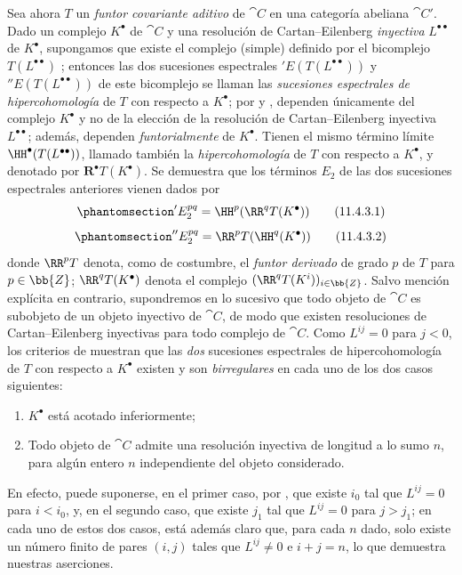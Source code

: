 \documentclass[oneside]{amsart}
\newcommand{\oldpage}[2][]{{\marginnote{\normalfont\textbf{#1}~|~#2}}\ignorespaces}
\let\EGAOriginalLabel\label
\renewcommand{\label}[1]{\phantomsection\EGAOriginalLabel{#1}}
\begin{document}
\begin{env}[11.4.3]
\label{0.11.4.3}
Sea ahora $T$ un \emph{funtor covariante aditivo} de $\cat{C}$ en una categoría abeliana $\cat{C'}$.
Dado un complejo $K^\bullet$ de $\cat{C}$ y una resolución de Cartan--Eilenberg \emph{inyectiva} $L^{\bullet\bullet}$ de $K^{\bullet}$, supongamos que existe el complejo (simple) definido por el bicomplejo $T(L^{\bullet\bullet})$ ;
entonces las dos sucesiones espectrales $'E(T(L^{\bullet\bullet}))$ y $''E(T(L^{\bullet\bullet}))$ de este bicomplejo se llaman las \emph{sucesiones espectrales de hipercohomología} de $T$ con respecto a $K^\bullet$;
por  y , dependen únicamente del complejo $K^\bullet$ y no de la elección de la resolución de Cartan--Eilenberg inyectiva $L^{\bullet\bullet}$;
además, dependen \emph{funtorialmente} de $K^\bullet$.
Tienen el mismo término límite $\HH^\bullet(T(L^{\bullet\bullet}))$, llamado también la \emph{hipercohomología} de $T$ con respecto a $K^\bullet$, y denotado por $\mathbf{R}^\bullet T(K^\bullet)$.
Se demuestra que los términos $E_2$ de las dos sucesiones espectrales anteriores vienen dados por
\[
\label{0.11.4.3.1}
  'E_2^{pq}
  = \HH^p(\RR^q T(K^\bullet))
\tag{11.4.3.1}
\]
\[
\label{0.11.4.3.2}
  ''E_2^{pq}
  = \RR^p T(\HH^q(K^\bullet))
\tag{11.4.3.2}
\]
\oldpage[0\textsubscript{III}]{34}
donde $\RR^p T$ denota, como de costumbre, el \emph{funtor derivado} de grado $p$ de $T$ para $p\in\bb{Z}$;
$\RR^q T(K^\bullet)$ denota el complejo $(\RR^q T(K^i))_{i\in\bb{Z}}$.
\label{0.11.4.4}
Salvo mención explícita en contrario, supondremos en lo sucesivo que todo objeto de $\cat{C}$ es subobjeto de un objeto inyectivo de $\cat{C}$, de modo que existen resoluciones de Cartan--Eilenberg inyectivas para todo complejo de $\cat{C}$.
Como $L^{ij}=0$ para $j<0$, los criterios de  muestran que las \emph{dos} sucesiones espectrales de hipercohomología de $T$ con respecto a $K^\bullet$ existen y son \emph{birregulares} en cada uno de los dos casos siguientes:
\begin{enumerate}
  \item $K^\bullet$ está acotado inferiormente;
  \item Todo objeto de $\cat{C}$ admite una resolución inyectiva de longitud a lo sumo $n$, para algún entero $n$ independiente del objeto considerado.
\end{enumerate}
En efecto, puede suponerse, en el primer caso, por , que existe $i_0$ tal que $L^{ij}=0$ para $i<i_0$, y, en el segundo caso, que existe $j_1$ tal que $L^{ij}=0$ para $j>j_1$;
en cada uno de estos dos casos, está además claro que, para cada $n$ dado, solo existe un número finito de pares $(i,j)$ tales que $L^{ij}\neq 0$ e $i+j=n$, lo que demuestra nuestras aserciones.


\end{env}
\end{document}
